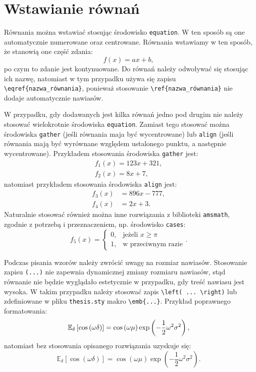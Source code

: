 \section{Wstawianie równań}

Równania można wstawiać stosując środowisko \verb|equation|. W ten sposób są one automatycznie numerowane oraz centrowane. Równania wstawiamy w ten sposób, że stanowią one część zdania:
\begin{equation}
f(x) = ax + b \label{eq:rownanie_1},
\end{equation}
po czym to zdanie jest kontynuowane. Do równań należy odwoływać się stosując ich nazwę, natomiast w tym przypadku używa się zapisu \verb|\eqref{nazwa_równania}|, ponieważ stosowanie \verb|\ref{nazwa_równania}| nie dodaje automatycznie nawiasów.

W przypadku, gdy dodawanych jest kilka równań jedno pod drugim nie należy stosować wielokrotnie środowiska \verb|equation|. Zamiast tego stosować można środowiska \verb|gather| (jeśli równania maja być wycentrowane) lub \verb|align| (jeśli równania mają być wyrównane względem ustalonego punktu, a następnie wycentrowane). Przykładem stosowania środowiska \verb|gather| jest:
\begin{gather}
f_{1}(x) = 123 x + 321 \label{eq:rownanie_2}, \\
f_{2}(x) = 8 x + 7 \label{eq:rownanie_3},
\end{gather}
natomiast przykładem stosowania środowiska \verb|align| jest:
\begin{align}
f_{3}(x) &= 896 x - 777 \label{eq:rownanie_4}, \\
f_{4}(x) &= 2 x + 3 \label{eq:rownanie_5}.
\end{align}
Naturalnie stosować również można inne rozwiązania z biblioteki \verb|amsmath|, zgodnie z potrzebą i przeznaczeniem, np. środowisko \verb|cases|:
\begin{equation}
f_{5}(x) = 
\begin{cases}
0, & \text{jeżeli $x \ge \pi$}  \\
1, & \text{w przeciwnym razie}
\end{cases}
\label{eq:rownanie_6}.
\end{equation}

Podczas pisania wzorów należy zwrócić uwagę na rozmiar nawiasów. Stosowanie zapisu \verb|(...)| nie zapewnia dynamicznej zmiany rozmiaru nawiasów, stąd równanie nie będzie wyglądało estetycznie w przypadku, gdy treść nawiasu jest wysoka. W takim przypadku należy stosować zapis \verb|\left( ... \right)| lub zdefiniowane w pliku \verb|thesis.sty| makro \verb|\emb{...}|. Przykład poprawnego formatowania:
\begin{equation}
\mathbb{E}_\delta \left[ \cos \left(\omega \delta\right) \right] = \cos \left(\omega \mu\right) \exp \left(-\frac{1}{2} \omega^2 \sigma^2\right) \label{eq:rownanie_7_dobrze},
\end{equation}
natomiast bez stosowania opisanego rozwiązania uzyskuje się:
\begin{equation}
\mathbb{E}_\delta [ \cos (\omega \delta) ] = \cos (\omega \mu) \exp (-\frac{1}{2} \omega^2 \sigma^2) \label{eq:rownanie_7_zle}.
\end{equation}

